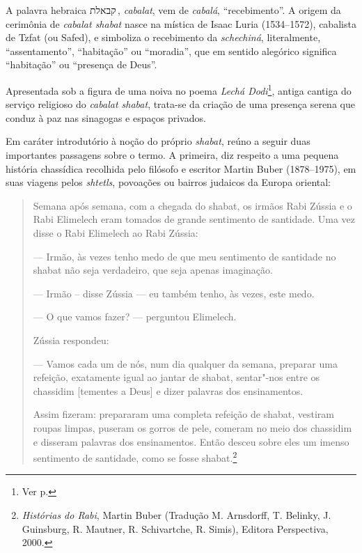 
A palavra hebraica קבאלת\,, 
\emph{cabalat}, vem de \emph{cabalá}, ``recebimento''. A
origem da cerimônia de \emph{cabalat shabat} nasce na mística de Isaac Luria (1534--1572),
cabalista de Tzfat (ou Safed), e simboliza o recebimento
da \emph{schechiná}, literalmente, ``assentamento'', ``habitação'' ou ``moradia'', que 
em sentido alegórico significa ``habitação'' ou ``presença de Deus''. 

Apresentada sob a figura de uma noiva no poema \emph{Lechá Dodi}\footnote{Ver p.\pageref{lecha}}, antiga cantiga do 
serviço religioso do \textit{cabalat shabat}, trata-se da criação de uma
presença serena que conduz à paz nas sinagogas e espaços privados.

Em caráter introdutório à noção do próprio \emph{shabat}, reúno a seguir duas importantes
passagens sobre o termo. A primeira, diz respeito a uma pequena história chassídica 
recolhida pelo filósofo e escritor  
Martin Buber (1878--1975), em suas viagens pelos \emph{shtetls}, povoações ou bairros 
judaicos da Europa oriental:

\begin{quote}
{Semana após semana, com a chegada do shabat, os irmãos Rabi Zússia
e o Rabi Elimelech eram tomados de grande sentimento de santidade. Uma
vez disse o Rabi Elimelech ao Rabi Zússia:}

{--- Irmão, às vezes tenho medo de que meu sentimento de santidade
no shabat não seja verdadeiro, que seja apenas imaginação.}

{--- Irmão -- disse Zússia --- eu também tenho, às vezes, este medo.}

{--- O que vamos fazer? --- perguntou Elimelech.}

{Zússia respondeu:}

{--- Vamos cada um de nós, num dia qualquer da semana, preparar uma
refeição, exatamente igual ao jantar de shabat, sentar"-nos entre os
chassidim [tementes a Deus] e dizer palavras dos ensinamentos.}

{Assim fizeram: prepararam uma completa refeição de shabat,
vestiram roupas limpas, puseram os gorros de pele, comeram no meio dos
chassidim e disseram palavras dos ensinamentos. Então desceu sobre eles
um imenso sentimento de santidade, como se fosse shabat.}\footnote{\emph{Histórias do Rabi}, Martin Buber (Tradução M. Arnsdorff, T. Belinky, J. Guinsburg, R. Mautner, R. Schivartche, R. Simis), Editora Perspectiva, 2000.}
\end{quote}

